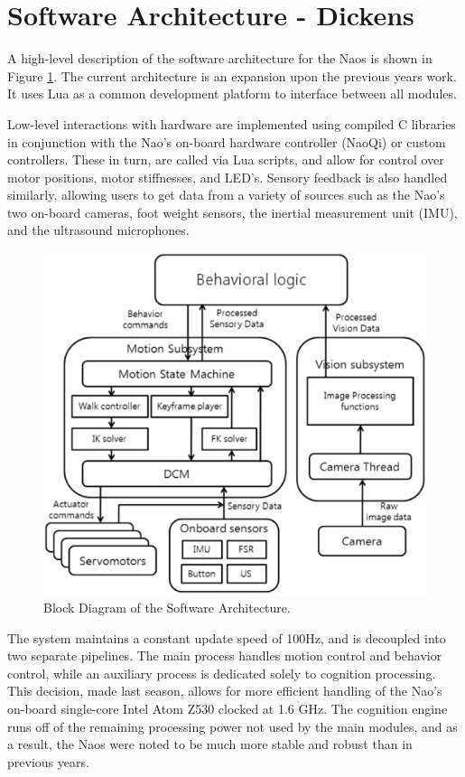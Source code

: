 \documentclass{article}
\begin{document}
\section{Software Architecture - Dickens}
	A high-level description of the software architecture for the Naos is shown in Figure \ref{fig:softarch}. The current architecture is an expansion upon the previous years work. It uses Lua as a common development platform to interface between all modules.

	Low-level interactions with hardware are implemented using compiled C libraries in conjunction with the Nao's on-board hardware controller (NaoQi) or custom controllers. These in turn, are called via Lua scripts, and allow for control over motor positions, motor stiffnesses, and LED's. Sensory feedback is also handled similarly, allowing users to get data from a variety of sources such as the Nao's two on-board cameras, foot weight sensors, the inertial measurement unit (IMU), and the ultrasound microphones.
	\begin{figure}[H]
		\centering
		\includegraphics[width=.9\textwidth]{figures/SoftArchOverview.eps}
		\caption{Block Diagram of the Software Architecture.}
		\label{fig:softarch}
	\end{figure}

	The system maintains a constant update speed of 100Hz, and is decoupled into two separate pipelines. The main process handles motion control and behavior control, while an auxiliary process is dedicated solely to cognition processing. This decision, made last season, allows for more efficient handling of the Nao's on-board single-core Intel Atom Z530 clocked at 1.6 GHz. The cognition engine runs off of the remaining processing power not used by the main modules, and as a result, the Naos were noted to be much more stable and robust than in previous years.
\end{document}
